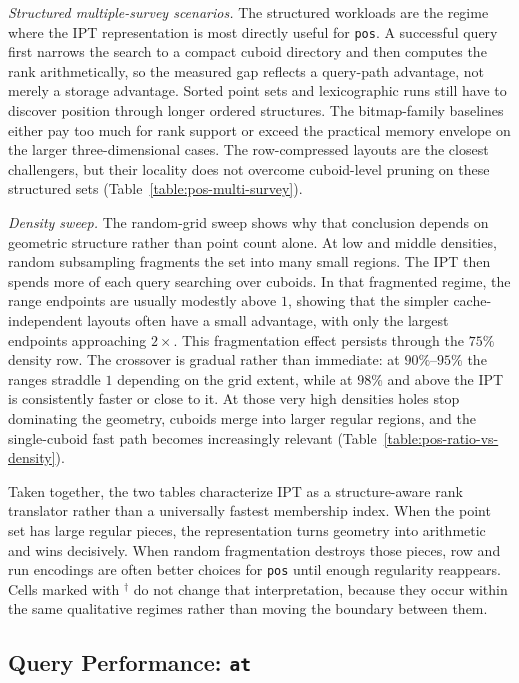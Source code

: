 \documentclass[manuscript,screen,review]{acmart}
\theoremstyle{definition}
\theoremstyle{plain}
\begin{document}
\emph{Structured multiple-survey scenarios.}
The structured workloads are the regime where the IPT representation
is most directly useful for \texttt{pos}. A successful query first
narrows the search to a compact cuboid directory and then computes the
rank arithmetically, so the measured gap reflects a query-path
advantage, not merely a storage advantage. Sorted point sets and
lexicographic runs still have to discover position through longer
ordered structures. The
bitmap-family baselines either pay too much for rank support or exceed
the practical memory envelope on the larger three-dimensional cases.
The row-compressed layouts are the closest challengers, but their
locality does not overcome cuboid-level pruning on these structured
sets (Table~\ref{table:pos-multi-survey}).

\emph{Density sweep.}
The random-grid sweep shows why that conclusion depends on geometric
structure rather than point count alone. At low and middle densities,
random subsampling fragments the set into many small regions. The IPT
then spends more of each query searching over cuboids. In that
fragmented regime, the range endpoints are usually modestly above
$1$, showing that the simpler cache-independent layouts often have a
small advantage, with only the largest endpoints approaching
$2\times$. This fragmentation effect persists through the $75\%$
density row. The crossover is gradual rather than immediate: at
$90\%$--$95\%$ the ranges straddle $1$ depending on the grid extent,
while at $98\%$ and above the IPT is consistently faster or close to
it. At those very high densities holes stop dominating the geometry,
cuboids merge into larger regular regions, and the single-cuboid fast
path becomes increasingly relevant
(Table~\ref{table:pos-ratio-vs-density}).

Taken together, the two tables characterize IPT as a structure-aware
rank translator rather than a universally fastest membership index.
When the point set has large regular pieces, the representation turns
geometry into arithmetic and wins decisively. When random fragmentation
destroys those pieces, row and run encodings are often better choices
for \texttt{pos} until enough regularity reappears. Cells marked with
$^{\dagger}$ do not change that interpretation, because they occur
within the same qualitative regimes rather than moving the boundary
between them.

\subsection{Query Performance: \texttt{at}}
\label{section:results-at}
\end{document}
